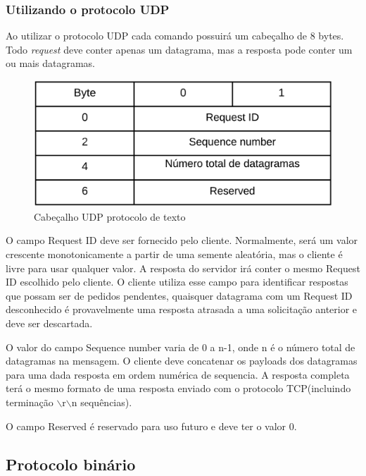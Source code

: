 \subsubsection{Utilizando o protocolo UDP}

Ao utilizar o protocolo UDP cada comando possuirá um cabeçalho de 8 bytes. Todo \textit{request} deve conter apenas um datagrama, mas a resposta pode conter um ou mais datagramas.

\begin{figure}[H]
     \centering
     \includegraphics[scale=0.5]{img/CabecalhoTP_UDP.pdf}
     \caption{Cabeçalho UDP protocolo de texto}
     \label{img:UPDtextproto}
\end{figure}

O campo Request ID deve ser fornecido pelo cliente. Normalmente, será um valor crescente monotonicamente a partir de uma semente aleatória, mas o cliente é livre para usar qualquer valor. A resposta do servidor irá conter o mesmo Request ID escolhido pelo cliente. O cliente utiliza esse campo para identificar respostas que possam ser de pedidos pendentes, quaisquer datagrama com um Request ID desconhecido é provavelmente uma resposta atrasada a uma solicitação anterior e deve ser descartada.

O valor do campo Sequence number varia de 0 a n-1, onde n é o número total de datagramas na mensagem. O cliente deve concatenar os payloads dos datagramas para uma dada resposta em ordem numérica de sequencia. A resposta completa terá o mesmo formato de uma resposta enviado com o protocolo TCP(incluindo terminação $\backslash$r$\backslash$n sequências).

O campo Reserved é reservado para uso futuro e deve ter o valor 0.

\subsection{Protocolo binário}

